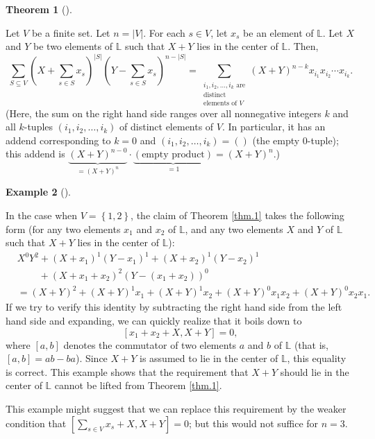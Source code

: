 \documentclass[numbers=enddot,12pt,final,onecolumn,notitlepage]{scrartcl}%
\theoremstyle{definition}
\newtheorem{theo}{Theorem}[section]
\newenvironment{theorem}[1][]
{\begin{theo}[#1]\begin{leftbar}}
{\end{leftbar}\end{theo}}
\newtheorem{exam}[theo]{Example}
\newenvironment{example}[1][]
{\begin{exam}[#1]\begin{leftbar}}
{\end{leftbar}\end{exam}}
\let\sumnonlimits\sum
\renewcommand{\sum}{\sumnonlimits\limits}
\begin{document}
\begin{theorem}
\label{thm.1}Let $V$ be a finite set. Let $n=\left\vert V\right\vert $. For
each $s\in V$, let $x_{s}$ be an element of $\mathbb{L}$. Let $X$ and $Y$ be
two elements of $\mathbb{L}$ such that $X+Y$ lies in the center of
$\mathbb{L}$. Then,%
\[
\sum_{S\subseteq V}\left(  X+\sum_{s\in S}x_{s}\right)  ^{\left\vert
S\right\vert }\left(  Y-\sum_{s\in S}x_{s}\right)  ^{n-\left\vert S\right\vert
}=\sum_{\substack{i_{1},i_{2},\ldots,i_{k}\text{ are}\\\text{distinct}%
\\\text{elements of }V}}\left(  X+Y\right)  ^{n-k}x_{i_{1}}x_{i_{2}}\cdots
x_{i_{k}}.
\]
(Here, the sum on the right hand side ranges over all nonnegative integers $k$
and all $k$-tuples $\left(  i_{1},i_{2},\ldots,i_{k}\right)  $ of distinct
elements of $V$. In particular, it has an addend corresponding to $k=0$ and
$\left(  i_{1},i_{2},\ldots,i_{k}\right)  =\left(  {}\right)  $ (the empty
$0$-tuple); this addend is $\underbrace{\left(  X+Y\right)  ^{n-0}}_{=\left(
X+Y\right)  ^{n}}\cdot\underbrace{\left(  \text{empty product}\right)  }%
_{=1}=\left(  X+Y\right)  ^{n}$.)
\end{theorem}


\begin{example}
In the case when $V=\left\{  1,2\right\}  $, the claim of Theorem \ref{thm.1}
takes the following form (for any two elements $x_{1}$ and $x_{2}$ of
$\mathbb{L}$, and any two elements $X$ and $Y$ of $\mathbb{L}$ such that $X+Y$
lies in the center of $\mathbb{L}$):%
\begin{align*}
&  X^{0}Y^{2}+\left(  X+x_{1}\right)  ^{1}\left(  Y-x_{1}\right)  ^{1}+\left(
X+x_{2}\right)  ^{1}\left(  Y-x_{2}\right)  ^{1}\\
&  \ \ \ \ \ \ \ \ \ \ +\left(  X+x_{1}+x_{2}\right)  ^{2}\left(  Y-\left(
x_{1}+x_{2}\right)  \right)  ^{0}\\
&  =\left(  X+Y\right)  ^{2}+\left(  X+Y\right)  ^{1}x_{1}+\left(  X+Y\right)
^{1}x_{2}+\left(  X+Y\right)  ^{0}x_{1}x_{2}+\left(  X+Y\right)  ^{0}%
x_{2}x_{1}.
\end{align*}
If we try to verify this identity by subtracting the right hand side from the
left hand side and expanding, we can quickly realize that it boils down to%
\[
\left[  x_{1}+x_{2}+X,X+Y\right]  =0,
\]
where $\left[  a,b\right]  $ denotes the commutator of two elements $a$ and
$b$ of $\mathbb{L}$ (that is, $\left[  a,b\right]  =ab-ba$). Since $X+Y$ is
assumed to lie in the center of $\mathbb{L}$, this equality is correct. This
example shows that the requirement that $X+Y$ should lie in the center of
$\mathbb{L}$ cannot be lifted from Theorem \ref{thm.1}.

This example might suggest that we can replace this requirement by the weaker
condition that $\left[  \sum_{s\in V}x_{s}+X,X+Y\right]  =0$; but this would
not suffice for $n=3$.
\end{example}
\end{document}
